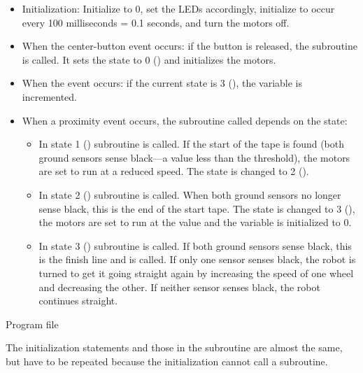 \begin{itemize}

\item Initialization: Initialize  to 0, set the LEDs
accordingly, initialize  to occur every 100 milliseconds = 0.1
seconds, and turn the motors off.

\item When the center-button event occurs: if the button is released,
the subroutine  is called. It sets the state to 0 () and
initializes the motors.

\item When the  event occurs: if the current state is 3
(), the variable  is incremented.

\item When a proximity event occurs, the subroutine called depends on
the state:

\begin{itemize}

\item In state 1 () subroutine  is called. If
the start of the tape is found (both ground sensors sense black---a
value less than the threshold), the motors are set to run at a reduced
speed. The state is changed to 2 ().

\item In state 2 () subroutine  is
called. When both ground sensors no longer sense black, this is the end
of the start tape. The state is changed to 3 (), the motors
are set to run at the value  and the variable  is
initialized to 0.

\item In state 3 () subroutine  is
called. If both ground sensors sense black, this is the finish line and
 is called. If only one sensor senses black, the robot is turned
to get it going straight again by increasing the speed of one wheel and
decreasing the other. If neither sensor senses black, the robot continues
straight.

\end{itemize}
\end{itemize}


{\raggedleft \hfill Program file }

The initialization statements and those in the subroutine  are
almost the same, but have to be repeated because the initialization
cannot call a subroutine.

